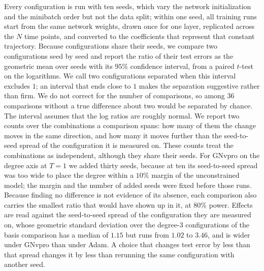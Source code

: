 \documentclass[pdflatex,sn-mathphys-num]{sn-jnl}%
\theoremstyle{thmstyleone}%
\theoremstyle{thmstyletwo}%
\theoremstyle{thmstylethree}%
\begin{document}
Every configuration is run with ten seeds, which vary the network initialization and the minibatch order but not the data split; within one seed, all training runs start from the same network weights, drawn once for one layer, replicated across the $N$ time points, and converted to the coefficients that represent that constant trajectory.
%
Because configurations share their seeds, we compare two configurations seed by seed and report the ratio of their test errors as the geometric mean over seeds with its $95\%$ confidence interval, from a paired $t$-test on the logarithms. We call two configurations separated when this interval excludes $1$; an interval that ends close to $1$ makes the separation suggestive rather than firm. We do not correct for the number of comparisons, so among $36$ comparisons without a true difference about two would be separated by chance. The interval assumes that the log ratios are roughly normal. We report two counts over the combinations a comparison spans: how many of them the change moves in the same direction, and how many it moves further than the seed-to-seed spread of the configuration it is measured on. These counts treat the combinations as independent, although they share their seeds. For GNvpro on the degree axis at $T=1$ we added thirty seeds, because at ten its seed-to-seed spread was too wide to place the degree within a $10\%$ margin of the unconstrained model; the margin and the number of added seeds were fixed before those runs.
%
Because finding no difference is not evidence of its absence, each comparison also carries the smallest ratio that would have shown up in it, at $80\%$ power. Effects are read against the seed-to-seed spread of the configuration they are measured on, whose geometric standard deviation over the degree-$3$ configurations of the basis comparison has a median of $1.15$ but runs from $1.02$ to $3.46$, and is wider under GNvpro than under Adam. A choice that changes test error by less than that spread changes it by less than rerunning the same configuration with another seed.
\end{document}
